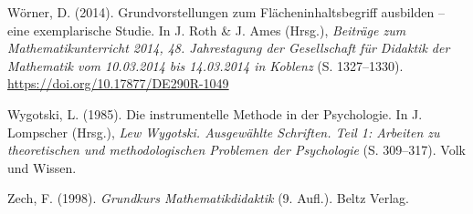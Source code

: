 \documentclass[
]{scrbook}
\newlength{\cslhangindent}
\newlength{\cslentryspacingunit} %
\newenvironment{CSLReferences}[2] %
 {%
  \setlength{\parindent}{0pt}
  \ifodd #1
  \let\oldpar\par
  \def\par{\hangindent=\cslhangindent\oldpar}
  \fi
  \setlength{\parskip}{#2\cslentryspacingunit}
 }%
 {}
\theoremstyle{definition}
\theoremstyle{definition}
\theoremstyle{definition}
\theoremstyle{definition}
\theoremstyle{remark}
\begin{document}
\begin{CSLReferences}{1}{0}
\leavevmode{}%
Wörner, D. (2014). Grundvorstellungen zum {Flächeninhaltsbegriff} ausbilden -- eine exemplarische {Studie}. In J. Roth \& J. Ames (Hrsg.), \emph{Beiträge zum {Mathematikunterricht} 2014, 48. {Jahrestagung} der {Gesellschaft} für {Didaktik} der {Mathematik} vom 10.03.2014 bis 14.03.2014 in {Koblenz}} (S. 1327--1330). \url{https://doi.org/10.17877/DE290R-1049}

\leavevmode{}%
Wygotski, L. (1985). Die instrumentelle {Methode} in der {Psychologie}. In J. Lompscher (Hrsg.), \emph{Lew {Wygotski}. {Ausgewählte} {Schriften}. {Teil} 1: {Arbeiten} zu theoretischen und methodologischen {Problemen} der {Psychologie}} (S. 309--317). Volk und Wissen.

\leavevmode{}%
Zech, F. (1998). \emph{Grundkurs {Mathematikdidaktik}} (9. Aufl.). Beltz Verlag.

\end{CSLReferences}

\printindex
\end{document}
